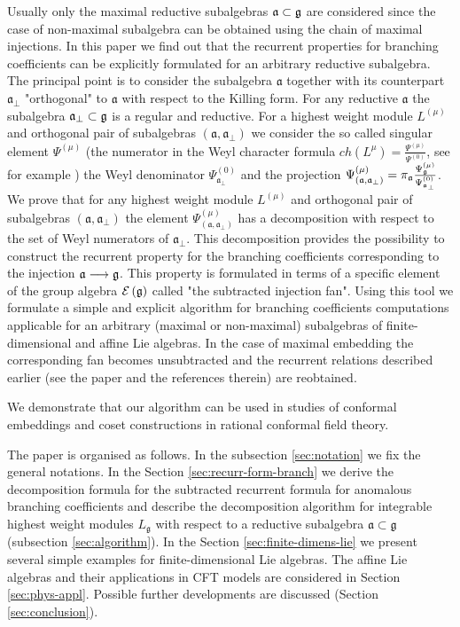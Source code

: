 \documentclass[12pt]{iopart}
\theoremstyle{definition}
\newcommand{\af}{\mathfrak{a}}
\newcommand{\afb}{\mathfrak{a}_{\bot}}
\begin{document}
Usually only the maximal reductive subalgebras $\frak{a} \subset \frak{g} $ are considered since the case of non-maximal subalgebra
can be obtained using the chain of maximal injections. In this paper we find out that the recurrent properties
for branching coefficients can be explicitly formulated for an arbitrary reductive subalgebra.
The principal point is to consider the subalgebra $\af$ together with its
counterpart $\afb$ "orthogonal" to $\af$ with respect to the Killing form.
For any reductive $\af$ the subalgebra $\afb \subset \frak{g} $ is a regular and reductive.
For a highest weight module $L^{\left( \mu \right)}$ and orthogonal pair of subalgebras
$\left(  \af, \afb \right)$ we consider
the so called singular element $\Psi^{\left( \mu \right)}$ (the numerator
in the Weyl character formula
$ch\left( L^{\mu }\right) =\frac{\Psi ^{\left( \mu \right) }}{\Psi ^{\left( 0\right) }}$, see for example \cite{humphreys1997introduction})
the Weyl denominator $\Psi ^{\left( 0\right) }_{\afb}$ and the projection
$\Psi ^{\left( \mu \right) }_{\left(  \af, \afb \right)}=\pi_{\af}\frac{\Psi ^{\left( \mu \right) }_{\frak{g}}}{\Psi ^{\left( 0\right) }_{\afb}}$.
We prove that for any highest weight module $L^{\left( \mu \right)}$ and orthogonal pair of subalgebras
$\left(  \af, \afb \right)$ the element $\Psi ^{\left( \mu \right) }_{\left(  \af, \afb \right)}$ has a decomposition with respect to
the set of Weyl numerators of $\afb$.
This decomposition provides the possibility to construct the recurrent property for the branching coefficients corresponding
to the injection $\frak{a} \longrightarrow \frak{g} $.
This property is formulated in
terms of a specific element of the group algebra $\mathcal{E}\left( \frak{g} \right)$ called "the subtracted injection fan".
Using this tool we formulate a simple and
explicit algorithm for branching coefficients computations applicable for an arbitrary (maximal or non-maximal)
subalgebras of finite-dimensional and affine Lie algebras.
In the case of maximal embedding the corresponding fan becomes unsubtracted and the recurrent relations described
earlier (see the paper \cite{ilyin812pbc}
and the references therein) are reobtained.

We demonstrate that our algorithm can be used in studies of conformal embeddings and coset constructions
in rational conformal field theory.

The paper is organised as follows. In the subsection \ref{sec:notation}  we fix the general notations.
In the Section \ref{sec:recurr-form-branch} we derive the decomposition formula for
the subtracted recurrent formula for anomalous
branching coefficients and describe the decomposition algorithm for integrable highest weight modules
$L_{\mathfrak{g}}$ with respect to a reductive subalgebra $\mathfrak{a}\subset \mathfrak{g}$
(subsection \ref{sec:algorithm}). In the Section \ref{sec:finite-dimens-lie} we present several
simple examples for finite-dimensional Lie algebras. The affine Lie algebras and their applications in
CFT models are considered in Section \ref{sec:phys-appl}.
Possible further developments are discussed (Section \ref{sec:conclusion}).
\end{document}
